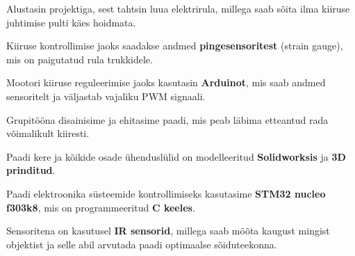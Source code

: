 \documentclass[letterpaper]{deedy-resume} %
\begin{document}
\begin{minipage}[t]{0.66\textwidth}
\begin{tightitemize}
\item Alustasin projektiga, sest tahtsin luua elektrirula, millega saab sõita ilma kiiruse juhtimise pulti käes hoidmata.
\item Kiiruse kontrollimise jaoks saadakse andmed \textbf{pingesensoritest} (strain gauge), mis on paigutatud rula trukkidele.
\item Mootori kiiruse reguleerimise jaoks kasutasin \textbf{Arduinot}, mis saab andmed sensoritelt ja väljastab vajaliku PWM signaali.
\end{tightitemize}

\sectionspace %



\begin{tightitemize}
\item Grupitööna disainisime ja ehitasime paadi, mis peab läbima etteantud rada võimalikult kiiresti.
\item Paadi kere ja kõikide osade ühenduslülid on modelleeritud \textbf{Solidworksis} ja \textbf{3D prinditud}.
\item Paadi elektroonika süsteemide kontrollimiseks kasutasime \textbf{STM32 nucleo f303k8}, mis on programmeeritud \textbf{C keeles}.
\item Sensoritena on kasutusel \textbf{IR sensorid}, millega saab mõõta kaugust mingist objektist ja selle abil arvutada paadi optimaalse sõiduteekonna.
\end{tightitemize}



\end{minipage}
\end{document}
